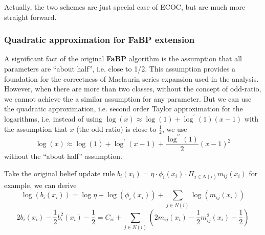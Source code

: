 Actually, the two schemes are just special case of ECOC, but are much more straight forward.

\subsubsection{Quadratic approximation for FaBP extension}
A significant fact of the original \textbf{FaBP} algorithm is the assumption that all parameters are ``about half'', i.e. close to 1/2. This assumption provides a foundation for the correctness of Maclaurin series expansion used in the analysis. However, when there are more than two classes, without the concept of odd-ratio, we cannot achieve the a similar assumption for any parameter. But we can use the quadratic approximation, i.e. second order Taylor approximation for the logarithms, i.e. instead of using $\log(x) \approx \log(1)+\log^{\prime}(1)(x-1)$ with the assumption that $x$ (the odd-ratio) is close to $\frac{1}{2}$, we use
$$\log(x)\approx \log(1)+\log^{\prime}(x-1)+\frac{\log^{\prime\prime}(1)}{2}(x-1)^2$$
without the ``about half'' assumption.

Take the original belief update rule $b_i(x_i) = \eta\cdot \phi_i(x_i)\cdot\Pi_{j\in N(i)}m_{ij}(x_i)$ for example, we can derive
\begin{equation}
\log(b_i(x_i))=\log\eta + \log(\phi_i(x_i))+ \sum_{j\in N(i)}\log(m_{ij}(x_i))
\end{equation}
\begin{equation}
\label{eq:quadratic approx}
2b_i(x_i)-\frac{1}{2}b_i^2(x_i)-\frac{1}{2}=C_{ii}+\sum_{j\in N(i)}(2m_{ij}(x_i)-\frac{1}{2}m_{ij}^2(x_i)-\frac{1}{2})
\end{equation}

